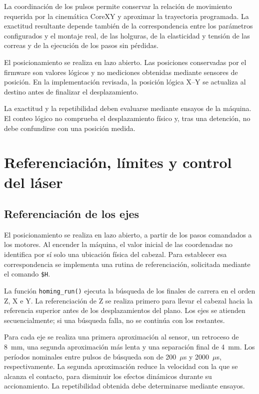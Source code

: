 \documentclass[blue,fullpaper]{ludusofficial}  %
\begin{document}
La coordinación de los pulsos permite conservar
la relación de movimiento requerida por la
cinemática CoreXY y aproximar la trayectoria
programada. La exactitud resultante depende
también de la correspondencia entre los parámetros
configurados y el montaje real, de las holguras,
de la elasticidad y tensión de las correas
y de la ejecución de los pasos sin pérdidas.

El posicionamiento se realiza en lazo abierto.
Las posiciones conservadas por el firmware
son valores lógicos y no mediciones obtenidas
mediante sensores de posición. En la implementación
revisada, la posición lógica X--Y se actualiza
al destino antes de finalizar el desplazamiento.

La exactitud y la repetibilidad deben evaluarse mediante ensayos de la máquina. El conteo lógico no comprueba el desplazamiento físico y, tras una detención, no debe confundirse con una posición medida.


\section{Referenciación, límites y control del láser}
\label{sec:referenciacion-laser}

\subsection{Referenciación de los ejes}

El posicionamiento se realiza en lazo abierto, a partir
de los pasos comandados a los motores. Al encender
la máquina, el valor inicial de las coordenadas
no identifica por sí solo una ubicación física del
cabezal. Para establecer esa correspondencia se
implementa una rutina de referenciación, solicitada
mediante el comando \texttt{\$H}.

La función \texttt{homing\_run()} ejecuta la búsqueda
de los finales de carrera en el orden Z, X e Y.
La referenciación de Z se realiza primero para
llevar el cabezal hacia la referencia superior
antes de los desplazamientos del plano.
Los ejes se atienden secuencialmente; si una búsqueda
falla, no se continúa con los restantes.

Para cada eje se realiza una primera aproximación
al sensor, un retroceso de 8~mm, una segunda
aproximación más lenta y una separación final
de 4~mm. Los períodos nominales entre pulsos
de búsqueda son de 200~$\mu$s y 2000~$\mu$s,
respectivamente. La segunda aproximación reduce
la velocidad con la que se alcanza el contacto,
para disminuir los efectos dinámicos durante
su accionamiento. La repetibilidad obtenida
debe determinarse mediante ensayos.
\end{document}
